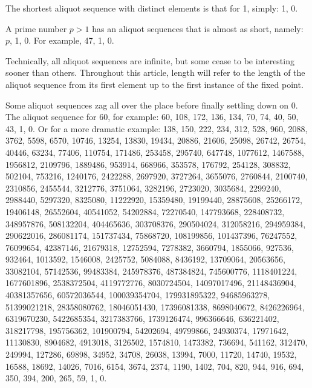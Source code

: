 \documentclass[12pt]{article}
\begin{document}
The shortest aliquot sequence with distinct elements is that for 1, simply: 1, 0.

A prime number $p > 1$ has an aliquot sequences that is almost as short, namely: $p$, 1, 0. For example, 47, 1, 0.

Technically, all aliquot sequences are infinite, but some cease to be interesting sooner than others. Throughout this article, length will refer to the length of the aliquot sequence from its first element up to the first instance of the fixed point.

Some aliquot sequences zag all over the place before finally settling down on 0. The aliquot sequence for 60, for example: 60, 108, 172, 136, 134, 70, 74, 40, 50, 43, 1, 0. Or for a more dramatic example: 138, 150, 222, 234, 312, 528, 960, 2088, 3762, 5598, 6570, 10746, 13254, 13830, 19434, 20886, 21606, 25098, 26742, 26754, 40446, 63234, 77406, 110754, 171486, 253458, 295740, 647748, 1077612, 1467588, 1956812, 2109796, 1889486, 953914, 668966, 353578, 176792, 254128, 308832, 502104, 753216, 1240176, 2422288, 2697920, 3727264, 3655076, 2760844, 2100740, 2310856, 2455544, 3212776, 3751064, 3282196, 2723020, 3035684, 2299240, 2988440, 5297320, 8325080, 11222920, 15359480, 19199440, 28875608, 25266172, 19406148, 26552604, 40541052, 54202884, 72270540, 147793668, 228408732, 348957876, 508132204, 404465636, 303708376, 290504024, 312058216, 294959384, 290622016, 286081174, 151737434, 75868720, 108199856, 101437396, 76247552, 76099654, 42387146, 21679318, 12752594, 7278382, 3660794, 1855066, 927536, 932464, 1013592, 1546008, 2425752, 5084088, 8436192, 13709064, 20563656, 33082104, 57142536, 99483384, 245978376, 487384824, 745600776, 1118401224, 1677601896, 2538372504, 4119772776, 8030724504, 14097017496, 21148436904, 40381357656, 60572036544, 100039354704, 179931895322, 94685963278, 51399021218, 28358080762, 18046051430, 17396081338, 8698040672, 8426226964, 6319670230, 5422685354, 3217383766, 1739126474, 996366646, 636221402, 318217798, 195756362, 101900794, 54202694, 49799866, 24930374, 17971642, 11130830, 8904682, 4913018, 3126502, 1574810, 1473382, 736694, 541162, 312470, 249994, 127286, 69898, 34952, 34708, 26038, 13994, 7000, 11720, 14740, 19532, 16588, 
18692, 14026, 7016, 6154, 3674, 2374, 1190, 1402, 704, 820, 944, 916, 694, 350, 394, 200, 265, 59, 1, 0.
\end{document}
